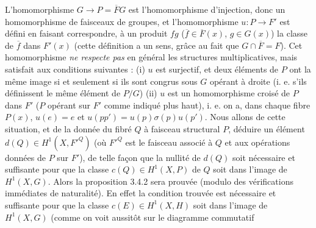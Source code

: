 L'homomorphisme $G\to P=\overline F G$ est l'homomorphisme
d'injection, donc un homomorphisme de faisceaux de groupes, et
l'homomorphisme $u:P\to F'$ est défini en faisant correspondre,
à un produit $f g$ ($\overline f\in\overline F(x)$,
$g\in G(x)$) la classe de $\overline f$ dans $F'(x)$ (cette définition a un
sens, grâce au fait que $G\cap\overline F=F$).
Cet homomorphisme \textit{ne respecte pas} en général les structures
multiplicatives, mais satisfait aux conditions suivantes : (i) $u$ est
surjectif, et deux éléments de $P$ ont la même image si et seulement si ils
sont congrus sous $G$ opérant à droite (i. e. s'ils définissent le même
élément de $P/G$) (ii) $u$ est un homomorphisme croisé de $P$ dans $F'$
($P$ opérant sur $F'$ comme indiqué plus haut), i. e. on a, dans chaque fibre
$P(x)$, $u(e)=e$ et $u(pp')=u(p)\sigma(p)u(p')$.
Nous allons de cette situation, et de la donnée du fibré $Q$ à faisceau
structural $P$, déduire un élément $d(Q)\in H^1(X,{F'}^Q)$ (où ${F'}^Q$ est
le faisceau associé à $Q$ et aux opérations données de $P$ sur $F'$), de telle
façon que la nullité de $d(Q)$ soit nécessaire et suffisante pour que la
classe $c(Q)\in H^1(X,P)$ de $Q$ soit dans l'image de $H^1(X,G)$. Alors la
proposition 3.4.2 sera prouvée (modulo des vérifications immédiates de
naturalité).
En effet la condition trouvée est nécessaire et suffisante pour que la classe
$c(E)\in H^1(X,H)$ soit dans l'image de $H^1(X,G)$ (comme on voit aussitôt
sur le diagramme commutatif

